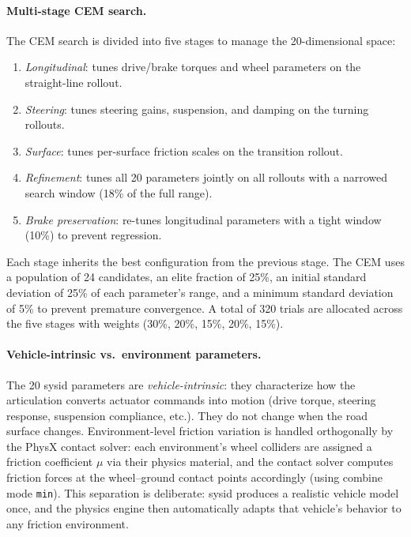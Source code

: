 \paragraph{Multi-stage CEM search.}
The CEM search is divided into five stages to manage the 20-dimensional space:
\begin{enumerate}[leftmargin=*, itemsep=1pt]
  \item \emph{Longitudinal}: tunes drive/brake torques and wheel parameters on the straight-line rollout.
  \item \emph{Steering}: tunes steering gains, suspension, and damping on the turning rollouts.
  \item \emph{Surface}: tunes per-surface friction scales on the transition rollout.
  \item \emph{Refinement}: tunes all 20 parameters jointly on all rollouts with a narrowed search window (18\% of the full range).
  \item \emph{Brake preservation}: re-tunes longitudinal parameters with a tight window (10\%) to prevent regression.
\end{enumerate}
Each stage inherits the best configuration from the previous stage.
The CEM uses a population of 24 candidates, an elite fraction of 25\%, an initial standard deviation of 25\% of each parameter's range, and a minimum standard deviation of 5\% to prevent premature convergence.
A total of 320 trials are allocated across the five stages with weights (30\%, 20\%, 15\%, 20\%, 15\%).

\paragraph{Vehicle-intrinsic vs.\ environment parameters.}
The 20 sysid parameters are \emph{vehicle-intrinsic}: they characterize how the articulation converts actuator commands into motion (drive torque, steering response, suspension compliance, etc.).
They do not change when the road surface changes.
Environment-level friction variation is handled orthogonally by the PhysX contact solver: each environment's wheel colliders are assigned a friction coefficient $\mu$ via their physics material, and the contact solver computes friction forces at the wheel--ground contact points accordingly (using combine mode \texttt{min}).
This separation is deliberate: sysid produces a realistic vehicle model once, and the physics engine then automatically adapts that vehicle's behavior to any friction environment.



